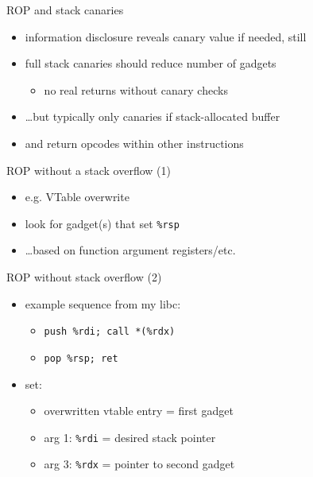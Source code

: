 \begin{frame}{ROP and stack canaries}
    \begin{itemize}
    \item information disclosure reveals canary value if needed, still
    \item full stack canaries should reduce number of gadgets
        \begin{itemize}
        \item no real returns without canary checks
        \end{itemize}
    \item \ldots but typically only canaries if stack-allocated buffer
    \item and return opcodes within other instructions
    \end{itemize}
\end{frame}

\begin{frame}{ROP without a stack overflow (1)}
    \begin{itemize}
    \item e.g. VTable overwrite
    \item look for gadget(s) that set {\tt \%rsp}
    \item \ldots based on function argument registers/etc.
    \end{itemize}
\end{frame}

\begin{frame}{ROP without stack overflow (2)}
    \begin{itemize}
    \item example sequence from my libc:
        \begin{itemize}
            \item \texttt{push \%rdi; call *(\%rdx)}
            \item \texttt{pop \%rsp; ret}
        \end{itemize}
    \item set:
        \begin{itemize}
        \item overwritten vtable entry = first gadget
        \item arg 1: {\tt \%rdi} = desired stack pointer
        \item arg 3: {\tt \%rdx} = pointer to second gadget
        \end{itemize}
    \end{itemize}
\end{frame}

